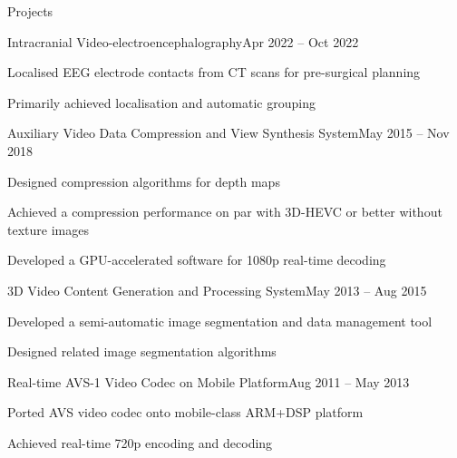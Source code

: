 \documentclass{resume} %
\begin{document}

\begin{rSection}{Projects}

	\begin{rSubsection}{Intracranial Video-electroencephalography}{Apr 2022 -- Oct 2022}{}{}
		\item Localised EEG electrode contacts from CT scans for pre-surgical planning
		\item Primarily achieved localisation and automatic grouping
	\end{rSubsection}

	\begin{rSubsection}{Auxiliary Video Data Compression and View Synthesis System}{May 2015 -- Nov 2018}{}{}
		\item Designed compression algorithms for depth maps
		\item Achieved a compression performance on par with 3D-HEVC or better without texture images
		\item Developed a GPU-accelerated software for 1080p real-time decoding
	\end{rSubsection}
		
	\begin{rSubsection}{3D Video Content Generation and Processing System}{May 2013 -- Aug 2015}{}{}
		\item Developed a semi-automatic image segmentation and data management tool
		\item Designed related image segmentation algorithms
	\end{rSubsection}
		
	\begin{rSubsection}{Real-time AVS-1 Video Codec on Mobile Platform}{Aug 2011 -- May 2013}{}{}
		\item Ported AVS video codec onto mobile-class ARM+DSP platform
		\item Achieved real-time 720p encoding and decoding
	\end{rSubsection}

\end{rSection}

\end{document}
